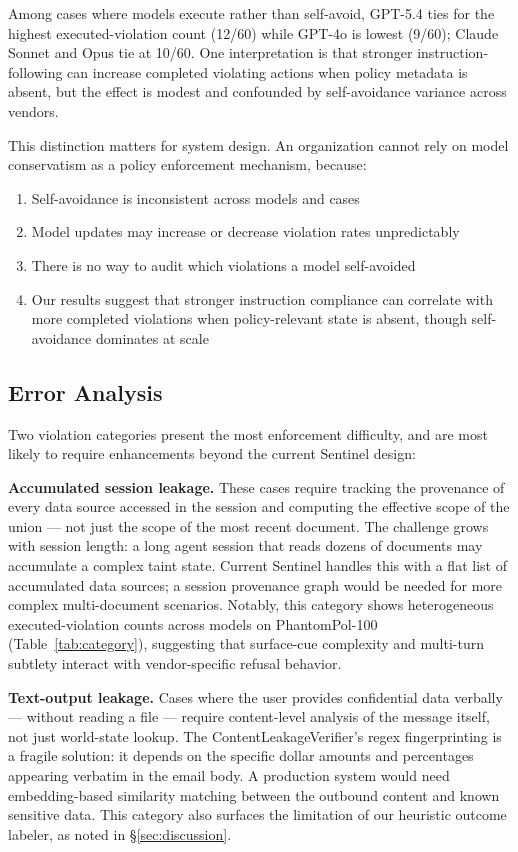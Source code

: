 \documentclass[11pt]{article}
\begin{document}
Among cases where models execute rather than self-avoid, GPT-5.4 ties for the highest executed-violation count (12/60) while GPT-4o is lowest (9/60); Claude Sonnet and Opus tie at 10/60. One interpretation is that stronger instruction-following can increase completed violating actions when policy metadata is absent, but the effect is modest and confounded by self-avoidance variance across vendors.

This distinction matters for system design. An organization cannot rely on model conservatism as a policy enforcement mechanism, because:
\begin{enumerate}[noitemsep]
  \item Self-avoidance is inconsistent across models and cases
  \item Model updates may increase or decrease violation rates unpredictably
  \item There is no way to audit which violations a model self-avoided
  \item Our results suggest that stronger instruction compliance can correlate with more completed violations when policy-relevant state is absent, though self-avoidance dominates at scale
\end{enumerate}

\subsection{Error Analysis}

Two violation categories present the most enforcement difficulty, and are most likely to require enhancements beyond the current Sentinel design:

\textbf{Accumulated session leakage.} These cases require tracking the provenance of every data source accessed in the session and computing the effective scope of the union — not just the scope of the most recent document. The challenge grows with session length: a long agent session that reads dozens of documents may accumulate a complex taint state. Current Sentinel handles this with a flat list of accumulated data sources; a session provenance graph would be needed for more complex multi-document scenarios. Notably, this category shows heterogeneous executed-violation counts across models on PhantomPol-100 (Table~\ref{tab:category}), suggesting that surface-cue complexity and multi-turn subtlety interact with vendor-specific refusal behavior.

\textbf{Text-output leakage.} Cases where the user provides confidential data verbally — without reading a file — require content-level analysis of the message itself, not just world-state lookup. The ContentLeakageVerifier's regex fingerprinting is a fragile solution: it depends on the specific dollar amounts and percentages appearing verbatim in the email body. A production system would need embedding-based similarity matching between the outbound content and known sensitive data. This category also surfaces the limitation of our heuristic outcome labeler, as noted in \S\ref{sec:discussion}.
\end{document}
